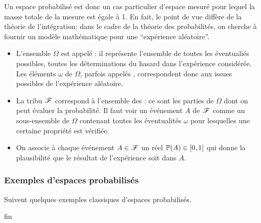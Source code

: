 \begin{interp}
    Un espace probabilisé est donc un cas particulier d'espace mesuré
    pour lequel la masse totale de la mesure est égale à 1. En fait,
    le point de vue diffère de la théorie de l'intégration: dans
    le cadre de la théorie des probabilités, on cherche à fournir
    un modèle mathématique pour une ``expérience aléatoire''.

    \begin{itemize}
        \item L'ensemble \(\Omega\) est appelé :
        il représente l'ensemble de toutes les éventualiés possibles,
        toutes les déterminations du hasard dans l'expérience considérée.
        Les éléments \(\omega\) de \(\Omega\), parfois appelés
        , correspondent donc aux issues
        possibles de l'expérience aléatoire.

        \item La tribu \(\mathscr{F}\) correspond à l'ensemble des
        :  ce sont les parties de \(\Omega\) dont
        on peut évaluer la probabilité. Il faut voir un événement
        \(A\) de \(\mathscr{F}\) comme un sous-ensemble de \(\Omega\) 
        contenant toutes les éventualités \(\omega\) pour
        lesquelles une certaine propriété est vérifiée.

        \item On associe à chaque événement \(A\in\mathscr{F}\) un réel
        \(\mathbb{P}(A) \in \mathopen{}\left[0,1\right]\mathclose{}\) qui donne la plausibilité que
        le résultat de l'expérience soit dans \(A\).
    \end{itemize}
\end{interp}

\subsubsection{Exemples d'espaces probabilisés}\label{subsubsec:2}
\setcounter{subsection}{0}
Suivent quelques exemples classiques d'espaces probabilisés.

\begin{exs}
    fin
\end{exs}

